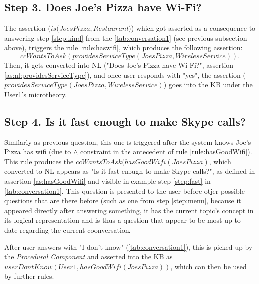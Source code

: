 \subsection{Step 3. Does Joe's Pizza have Wi-Fi?}
\label{section:step3}
The assertion ($is(JoesPizza,Restaurant$)) which got asserted as a consequence
to answering step \ref{step:kind} from the \autoref{tab:conversation1} (see
previous subsection above), triggers the rule \ref{rule:haswifi}, which 
produces the following assertion: 
\begin{equation*}
ccWantsToAsk(providesServiceType(JoesPizza,WirelessService)).
\end{equation*}
Then, it gets converted into NL ("Does Joe's Pizza have Wi-Fi?", 
assertion \ref{as:nl:providesServiceType}), 
and once user responds with "yes", the assertion 
($providesServiceType(JoesPizza,WirelessService)$) goes into the KB under the 
User1's microtheory.

\subsection{Step 4. Is it fast enough to make Skype calls?}
\label{section:step3}
Similarly as previous question, this one is triggered after the system knows
Joe's Pizza has wifi (due to $\land $ constraint in the antecedent of rule 
\ref{rule:hasGoodWifi}). This rule produces the 
$ccWantsToAsk(hasGoodWifi(JoesPizza)$, which converted to NL appears as 
"Is it fast enough to make Skype calls?", as defined in assertion 
\ref{as:hasGoodWifi} and visible in example step \ref{step:fast} in 
\autoref{tab:conversation1}. This question is presented to the user before
otjer possible questions that are there before (such as one from step 
\ref{step:menu}, because it appeared directly after answering something,
it has the current topic's concept in its logical representation and is
thus a question that appear to be most up-to date regarding the current
coonversation.

After user answers with "I don't know" (\autoref{tab:conversation1}), this is 
picked up by the \emph{Procedural Component} and asserted into the KB as 
$userDontKnow(User1,hasGoodWifi(JoesPizza))$, which can then be used by further 
rules.

